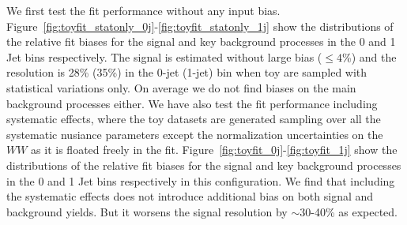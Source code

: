 We first test the fit performance without any input bias. 
Figure~\ref{fig:toyfit_statonly_0j}-\ref{fig:toyfit_statonly_1j} show the distributions of the relative fit biases 
for the signal and key background processes in the 0 and 1 Jet bins respectively. 
The signal is estimated without large bias ($\leq 4$\%) and the resolution is 28\% (35\%) in the 0-jet (1-jet) bin 
when toy are sampled with statistical variations only. 
On average we do not find biases on the main background processes either. 
We have also test the fit performance including systematic effects, where the 
toy datasets are generated sampling over all the systematic nusiance parameters except the normalization 
uncertainties on the $WW$ as it is floated freely in the fit. 
Figure~\ref{fig:toyfit_0j}-\ref{fig:toyfit_1j} show the distributions of the relative fit biases 
for the signal and key background processes in the 0 and 1 Jet bins respectively in this configuration.  
We find that including the systematic effects does not introduce additional bias on both 
signal and background yields. But it worsens the signal resolution by $\sim$30-40\% as expected.  


